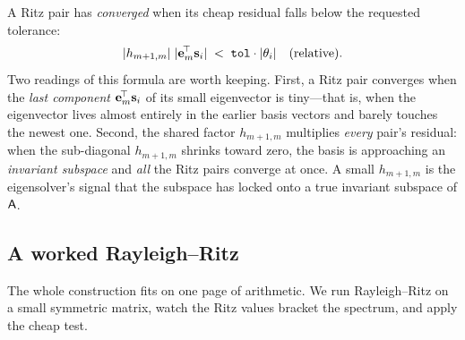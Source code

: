 \begin{notationbox}
A Ritz pair has \emph{converged} when its cheap residual falls below the requested
tolerance:
\[
  \lvert h_{m+1,m}\rvert\;\lvert\mathbf{e}_m^{\!\top}\mathbf{s}_i\rvert \;<\; \texttt{tol}\cdot\lvert\theta_i\rvert
  \quad\text{(relative)}.
\]
Two readings of this formula are worth keeping. First, a Ritz pair converges when the
\emph{last component} $\mathbf{e}_m^{\!\top}\mathbf{s}_i$ of its small eigenvector is tiny---that is,
when the eigenvector lives almost entirely in the earlier basis vectors and barely
touches the newest one. Second, the shared factor $h_{m+1,m}$ multiplies \emph{every}
pair's residual: when the sub-diagonal $h_{m+1,m}$ shrinks toward zero, the basis is
approaching an \emph{invariant subspace} and \emph{all} the Ritz pairs converge at once.
A small $h_{m+1,m}$ is the eigensolver's signal that the subspace has locked onto a true
invariant subspace of $\mathsf{A}$.
\end{notationbox}

\subsection{A worked Rayleigh--Ritz}

The whole construction fits on one page of arithmetic. We run Rayleigh--Ritz on a small
symmetric matrix, watch the Ritz values bracket the spectrum, and apply the cheap test.


